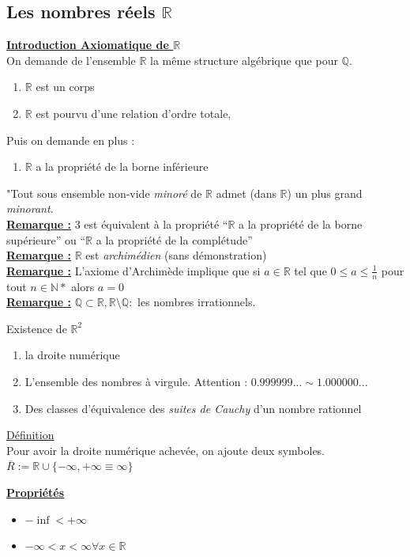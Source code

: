 \documentclass[12pt,a4paper]{article}
\newcommand{\evid}[1]{\textbf{\underline{#1}}}
\newcommand{\R}{\ensuremath{\mathbb{R}} }
\newcommand{\N}{\ensuremath{\mathbb{N}} }
\newcommand{\Q}{\ensuremath{\mathbb{Q}} }
\newcommand{\Definition}{\underline{Définition} }
\begin{document}
\subsection{Les nombres réels $\R$}
\evid{Introduction Axiomatique de $\R$ }\\
On demande de l'ensemble $\R$ la même structure algébrique que pour $\mathbb{Q}$.
\begin{enumerate}
	\item $\R$ est un corps
	\item $\R$ est pourvu d'une relation d'ordre totale,
\end{enumerate}
Puis on demande en plus :
\begin{enumerate}%
	\item $\R$ a la propriété de la borne inférieure
\end{enumerate}
"Tout sous ensemble non-vide \textit{minoré} de $\R$ admet (dans $\R$) un plus grand \textit{minorant}.\\
\evid{Remarque :} 3 est équivalent à la propriété ``\R a la propriété de la borne supérieure'' ou ``\R a la propriété de la complétude''\\
\evid{Remarque :} \R est \textit{archimédien} (sans démonstration)\\
\evid{Remarque :} L'axiome d'Archimède implique que si $a \in \R$ tel que $0\leq a \leq \frac{1}{n}$ pour tout $n \in \N*$ alors $a = 0$\\
\evid{Remarque :} $\Q \subset \R, \R \setminus \Q :$ les nombres irrationnels.\\

{\setlength{\baselineskip}{3pt}
Existence de $\R^2$\\
\begin{enumerate}
	\item la droite numérique
	\item L'ensemble des nombres à virgule. Attention : $0.999999... \sim 1.000000...$
	\item Des classes d'équivalence des \textit{suites de Cauchy} d'un nombre rationnel
\end{enumerate}}
\begin{boite}
\Definition\\
	Pour avoir la droite numérique achevée, on ajoute deux symboles. $\overline{R} := \R \cup \{-\infty, +\infty \equiv \infty\}$
\end{boite}
\evid{Propriétés}\\
\begin{itemize}
	\item $-\inf < +\infty$
	\item $-\infty < x < \infty  \forall x \in \R$
\end{itemize}
\end{document}
